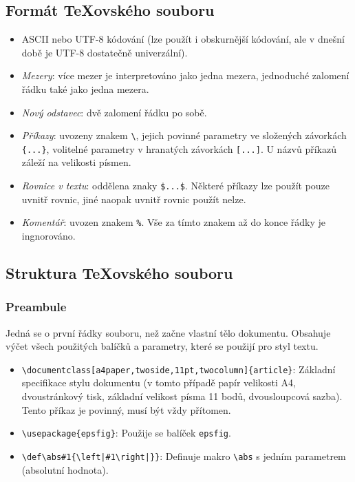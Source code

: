 \documentclass[a4paper,11pt,twoside]{article}
\def\abs#1{\left|#1\right|}
\theoremstyle{red}
\theoremstyle{green}
\begin{document}
    \subsection{Formát \TeX{}ovského souboru}
    \begin{itemize}
        \item ASCII nebo UTF-8 kódování (lze použít i obskurnější kódování, ale v dnešní době je UTF-8 dostatečně univerzální).
        \item \emph{Mezery}: více mezer je interpretováno jako jedna mezera, jednoduché zalomení řádku také jako jedna mezera.
        \item \emph{Nový odstavec}: dvě zalomení řádku po sobě.
        \item \emph{Příkazy}: uvozeny znakem \verb+\+, jejich povinné parametry ve složených závorkách \verb+{...}+, volitelné parametry v hranatých závorkách \verb+[...]+.
            U názvů příkazů záleží na velikosti písmen.
        \item \emph{Rovnice v textu}: oddělena znaky \verb+$...$+. Některé příkazy lze použít pouze uvnitř rovnic, jiné naopak uvnitř rovnic použít nelze.
        \item \emph{Komentář}: uvozen znakem \verb+%+. Vše za tímto znakem až do konce řádky je ingnorováno.
    \end{itemize}

    \subsection{Struktura \TeX{}ovského souboru}
        \subsubsection{Preambule}
            Jedná se o první řádky souboru, než začne vlastní tělo dokumentu.
            Obsahuje výčet všech použitých balíčků a parametry, které se použijí pro styl textu.
            \begin{itemize}
                \item \verb+\documentclass[a4paper,twoside,11pt,twocolumn]{article}+: Základní specifikace stylu dokumentu (v tomto případě papír velikosti A4, dvoustránkový tisk, základní velikost písma 11 bodů, dvousloupcová sazba).
                Tento příkaz je povinný, musí být vždy přítomen.

                \item \verb+\usepackage{epsfig}+: Použije se balíček \verb+epsfig+.
                
                \item \verb+\def\abs#1{\left|#1\right|}}+: Definuje makro \verb+\abs+ s jedním parametrem (absolutní hodnota).
            \end{itemize}
\end{document}
